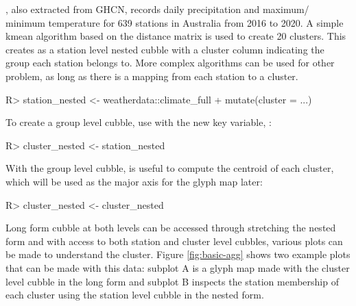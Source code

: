 \documentclass[
]{jss}
\begin{document}
, also extracted from GHCN, records
daily precipitation and maximum/ minimum temperature for 639 stations in
Australia from 2016 to 2020. A simple kmean algorithm based on the
distance matrix is used to create 20 clusters. This creates
 as a station level nested cubble with a cluster
column indicating the group each station belongs to. More complex
algorithms can be used for other problem, as long as there is a mapping
from each station to a cluster.

\begin{CodeChunk}
\begin{CodeInput}
R> station_nested <- weatherdata::climate_full %
+   mutate(cluster = ...)
\end{CodeInput}
\end{CodeChunk}

To create a group level cubble, use  with the new key
variable, :

\begin{CodeChunk}
\begin{CodeInput}
R> cluster_nested <- station_nested %
\end{CodeInput}
\end{CodeChunk}

With the group level cubble,  is useful to compute
the centroid of each cluster, which will be used as the major axis for
the glyph map later:

\begin{CodeChunk}
\begin{CodeInput}
R> cluster_nested <- cluster_nested %
\end{CodeInput}
\end{CodeChunk}

Long form cubble at both levels can be accessed through stretching the
nested form and with access to both station and cluster level cubbles,
various plots can be made to understand the cluster. Figure
\ref{fig:basic-agg} shows two example plots that can be made with this
data: subplot A is a glyph map made with the cluster level cubble in the
long form and subplot B inspects the station membership of each cluster
using the station level cubble in the nested form.
\end{document}
